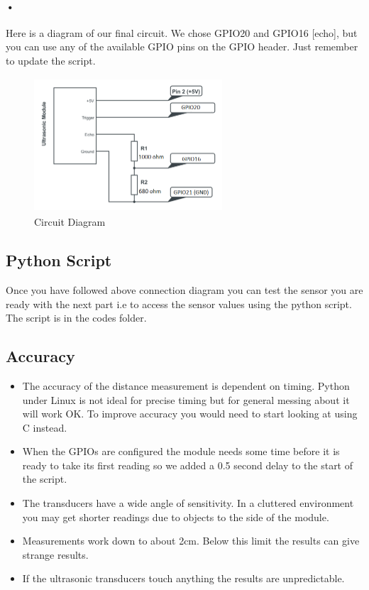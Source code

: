 \documentclass[11pt,a4paper]{article}
\begin{document}
\paragraph{•}
Here is a diagram of our final circuit. We chose GPIO20 and GPIO16 [echo], but you can use any of the available GPIO pins on the GPIO header. Just remember to update the script.
	\begin{figure}[H]
	 	\centering
		\includegraphics[width=7cm,height=5cm]{pin}
		\caption{Circuit Diagram}
	\end{figure}
	\subsection{Python Script}
		Once you have followed above connection diagram you can test the sensor you are ready with the next part i.e to access the sensor values using the python script. The script is in the codes folder.
	\subsection{Accuracy}
		\begin{itemize}
			\item The accuracy of the distance measurement is dependent on timing. Python under Linux is not ideal for precise timing but for general messing about it will work OK. To improve accuracy you would need to start looking at using C instead.
			\item When the GPIOs are configured the module needs some time before it is ready to take its first reading so we added a 0.5 second delay to the start of the script.
			\item The transducers have a wide angle of sensitivity. In a cluttered environment you may get shorter readings due to objects to the side of the module.
			\item Measurements work down to about 2cm. Below this limit the results can give strange results.
			\item If the ultrasonic transducers touch anything the results are unpredictable.
		\end{itemize}
\end{document}
